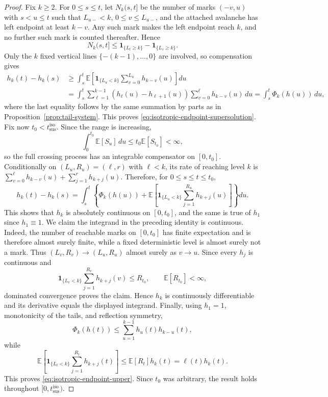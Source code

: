 \documentclass[11pt,a4paper]{amsart}
\theoremstyle{remark}
\begin{document}
\begin{proof}
Fix $k\geq2$. For $0\leq s\leq t$, let $N_k(s,t]$ be the number of
marks $(-v,u)$ with $s<u\leq t$ such that $L_{u-}<k$,
$0\leq v\leq L_{u-}$, and the attached avalanche has left endpoint at
least $k-v$. Any such mark makes the left endpoint reach $k$, and no
further such mark is counted thereafter. Hence
\[
N_k(s,t]
\leq
\mathbf{1}_{\{L_t\geq k\}}
-\mathbf{1}_{\{L_s\geq k\}}.
\]
Only the $k$ fixed vertical lines $\{-(k-1),\ldots,0\}$ are involved, so
compensation gives
\[
\begin{aligned}
h_k(t)-h_k(s)
&\geq
\int_s^t
\mathbb{E}\left[
\mathbf{1}_{\{L_u<k\}}
\sum_{v=0}^{L_u}h_{k-v}(u)
\right]du  \\
&=
\int_s^t\sum_{\ell=1}^{k-1}
(h_\ell(u)-h_{\ell+1}(u))
\sum_{v=0}^{\ell}h_{k-v}(u)\,du
=
\int_s^t\Phi_k(h(u))\,du,
\end{aligned}
\]
where the last equality follows by the same summation by parts as in
Proposition~\ref{prop:tail-system}. This proves
\eqref{eq:isotropic-endpoint-supersolution}.
Fix now $t_0<t_{\mathrm{sus}}^{\mathrm{iso}}$. Since the range is
increasing,
\[
\int_0^{t_0}\mathbb{E}[S_u]\,du
\leq t_0\mathbb{E}[S_{t_0}]<\infty,
\]
so the full crossing process has an integrable compensator on
$[0,t_0]$. Conditionally on $(L_u,R_u)=(\ell,r)$ with $\ell<k$, its
rate of reaching level $k$ is
$\sum_{v=0}^{\ell}h_{k-v}(u)+\sum_{j=1}^{r}h_{k+j}(u)$. Therefore, for
$0\leq s\leq t\leq t_0$,
\[
h_k(t)-h_k(s)
=
\int_s^t\left\{
\Phi_k(h(u))
+
\mathbb{E}\left[
\mathbf{1}_{\{L_u<k\}}
\sum_{j=1}^{R_u}h_{k+j}(u)
\right]\right\}du.
\]
This shows that $h_k$ is absolutely
continuous on $[0,t_0]$,  
and the same is true of $h_1$ since $h_1\equiv1$.
We claim the integrand in the preceding identity is continuous. Indeed, the
number of reachable marks on $[0,t_0]$ has finite expectation and is
therefore almost surely finite, while a fixed deterministic level is
almost surely not a mark. Thus $(L_v,R_v)\to(L_u,R_u)$ almost surely as
$v\to u$. Since every $h_j$ is continuous and
\[
\mathbf{1}_{\{L_v<k\}}
\sum_{j=1}^{R_v}h_{k+j}(v)
\leq R_{t_0},
\qquad \mathbb{E}[R_{t_0}]<\infty,
\]
dominated convergence proves the claim. Hence $h_k$ is continuously
differentiable and its derivative equals the displayed integrand.
Finally, using $h_1=1$, monotonicity of the tails, and reflection
symmetry,
\[
\Phi_k(h(t))
\leq
\sum_{u=1}^{k-1}h_u(t)h_{k-u}(t),
\]
while
\[
\mathbb{E}\left[
\mathbf{1}_{\{L_t<k\}}
\sum_{j=1}^{R_t}h_{k+j}(t)
\right]
\leq
\mathbb{E}[R_t]h_k(t)
=
\ell(t)h_k(t).
\]
This proves \eqref{eq:isotropic-endpoint-upper}. Since $t_0$ was
arbitrary, the result holds throughout
$[0,t_{\mathrm{sus}}^{\mathrm{iso}})$.
\end{proof}
\end{document}
